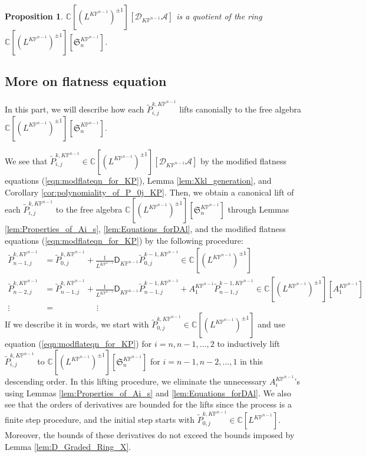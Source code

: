 \documentclass[12pt]{amsart}
\newtheorem{prop}{Proposition}[section]
\numberwithin{equation}{section}
\newcommand{\KP}{K\mathbb{P}}
\begin{document}
\begin{prop}\label{pro:CDA_Simplification}
$\mathbb{C}[(L^{\KP^{n-1}})^{\pm 1}][\mathcal{D}_{\KP^{n-1}}\mathcal{A}]$ is a quotient of the ring $\mathbb{C}[(L^{\KP^{n-1}})^{\pm 1}][\mathfrak{S}^{\KP^{n-1}}_n]$.
\end{prop}

\subsection{More on flatness equation} 
In this part, we will describe how each $\widetilde{P}_{i,j}^{k,\KP^{n-1}}$ lifts canonially to the free algebra $\mathbb{C}[(L^{\KP^{n-1}})^{\pm 1}][\mathfrak{S}^{\KP^{n-1}}_n]$.

We see that $\widetilde{P}_{i,j}^{k,\KP^{n-1}}\in\mathbb{C}[(L^{\KP^{n-1}})^{\pm 1}][\mathcal{D}_{\KP^{n-1}}\mathcal{A}]$ by the modified flatness equations (\ref{eqn:modflateqn_for_KP}), Lemma \ref{lem:Xkl_generation}, and Corollary \ref{cor:polynomiality_of_P_0j_KP}. Then, we obtain a canonical lift of each $\widetilde{P}_{i,j}^{k,\KP^{n-1}}$ to the free algebra $\mathbb{C}[(L^{\KP^{n-1}})^{\pm 1}][\mathfrak{S}^{\KP^{n-1}}_n]$ through  Lemmas \ref{lem:Properties_of_Ai_s},  \ref{lem:Equations_forDAl}, and the modified flatness equations (\ref{eqn:modflateqn_for_KP}) by the following procedure:
\begin{equation}\label{eq:ModifiedFlatnessLift}
\begin{split}
\widetilde{P}_{n-1,j}^{k,\KP^{n-1}}&=\widetilde{P}_{0,j}^{k,\KP^{n-1}}+\frac{1}{L^{\KP^{n-1}}}\mathsf{D}_{\KP^{n-1}}\widetilde{P}_{0,j}^{k-1,\KP^{n-1}}\in\mathbb{C}[(L^{\KP^{n-1}})^{\pm 1}]\\
\widetilde{P}_{n-2,j}^{k,\KP^{n-1}}&=\widetilde{P}_{n-1,j}^{k,\KP^{n-1}}+\frac{1}{L^{\KP^{n-1}}}\mathsf{D}_{\KP^{n-1}}\widetilde{P}_{n-1,j}^{k-1,\KP^{n-1}}+A^{\KP^{n-1}}_1\widetilde{P}_{n-1,j}^{k-1,\KP^{n-1}}\in\mathbb{C}[(L^{\KP^{n-1}})^{\pm 1}][A^{\KP^{n-1}}_1]\\
\vdots \,\,\,\,\,\, &=\,\,\,\,\,\,\,\,\,\,\,\,\,\,\,\,\,\,\,\,\,\,\,\,\,\,\,\,\,\,\vdots
\end{split}
\end{equation}
If we describe it in words, we start with $\widetilde{P}_{0,j}^{k,\KP^{n-1}}\in \mathbb{C}[(L^{\KP^{n-1}})^{\pm 1}]$ and use equation (\ref{eqn:modflateqn_for_KP}) for $i=n, n-1,..., 2$ to inductively lift $\widetilde{P}_{i,j}^{k,\KP^{n-1}}$ to $\mathbb{C}[(L^{\KP^{n-1}})^{\pm 1}][\mathfrak{S}^{\KP^{n-1}}_n]$ for $i=n-1, n-2,...,1$ in this descending order. In this lifting procedure, we eliminate the unnecessary $A^{\KP^{n-1}}_i$'s using Lemmas \ref{lem:Properties_of_Ai_s} and \ref{lem:Equations_forDAl}. We also see that the orders of derivatives are bounded for the lifts since the process is a finite step procedure, and the initial step starts with $\widetilde{P}_{0,j}^{k,\KP^{n-1}}\in \mathbb{C}[L^{\KP^{n-1}}]$. Moreover, the bounds of these derivatives do not exceed the bounds imposed by Lemma \ref{lem:D_Graded_Ring_X}.
\end{document}
